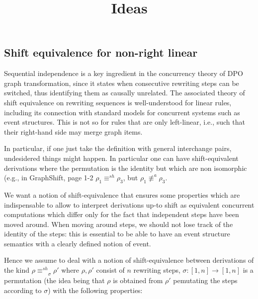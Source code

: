 \documentclass{llncs}
\title{Ideas}
\newcommand{\interval}[2][1]{\ensuremath{[{#1},{#2}]}}
\newcommand{\shifteq}[1][]{\ensuremath{\mathrel{{\equiv}^\mathit{sh}_{#1}}}}
\begin{document}
\maketitle



  
\subsection*{Shift equivalence for non-right linear}

Sequential independence is a key ingredient in the concurrency theory of DPO graph transformation, since it states when consecutive rewriting steps can be switched, thus 
identifying them as causally unrelated. The associated theory of shift equivalence on rewriting sequences is well-understood for linear rules, including its 
connection with standard models for concurrent systems such as event structures. 
%
This is not so for rules that are only left-linear, i.e., such that
their right-hand side may merge graph items.


In particular, if one just take the definition with general
interchange pairs, undesidered things might happen. In particular one
can have shift-equivalent derivations where the permutation is the
identity but which are non isomorphic (e.g., in GraphShift, page 1-2
$\rho_1 \shifteq \rho_3$, but $\rho_1 \not\equiv^{a} \rho_3$.
  
We want a notion of shift-equivalence that ensures some properties
which are indispensable to allow to interpret derivations up-to shift
as equivalent concurrent computations which differ only for the fact
that independent steps have been moved around. When moving around steps, we should not lose track of the identity of the steps: this is essential to be able to have an event structure semantics with a clearly defined notion of event.


Hence we assume to deal
with a notion of shift-equivalence between derivations of the kind
$\rho \shifteq_\sigma \rho'$ where $\rho, \rho'$ consist of $n$
rewriting steps, $\sigma: \interval{n} \to \interval{n}$ is a
permutation (the idea being that $\rho$ is obtained from $\rho'$
pemutating the steps according to $\sigma$) with the following
properties:
\end{document}
